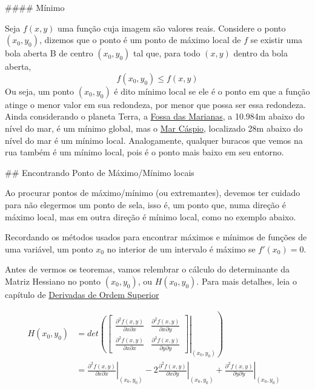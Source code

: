 \documentclass[
  letterpaper,
  DIV=11,
  numbers=noendperiod]{scrreprt}
\begin{document}
\#\#\#\# Mínimo

Seja \(f(x,y)\) uma função cuja imagem são valores reais. Considere o
ponto \((x_0, y_0)\), dizemos que o ponto é um ponto de máximo local de
\(f\) se existir uma bola aberta B de centro \((x_0, y_0)\) tal que,
para todo \((x,y)\) dentro da bola aberta, \[
  f(x_0,y_0) \leq f(x,y)
  \] Ou seja, um ponto \((x_0, y_0)\) é dito mínimo local se ele é o
ponto em que a função atinge o menor valor em sua redondeza, por menor
que possa ser essa redondeza. Ainda considerando o planeta Terra, a
\href{https://pt.wikipedia.org/wiki/Fossa_das_Marianas}{Fossa das
Marianas}, a 10.984m abaixo do nível do mar, é um mínimo global, mas o
\href{https://pt.wikipedia.org/wiki/Mar_Cáspio}{Mar Cáspio}, localizado
28m abaixo do nível do mar é um mínimo local. Analogamente, qualquer
buracos que vemos na rua também é um mínimo local, pois é o ponto mais
baixo em seu entorno.

\#\# Encontrando Ponto de Máximo/Mínimo locais

Ao procurar pontos de máximo/mínimo (ou extremantes), devemos ter
cuidado para não elegermos um ponto de sela, isso é, um ponto que, numa
direção é máximo local, mas em outra direção é mínimo local, como no
exemplo abaixo.

Recordando os métodos usados para encontrar máximos e mínimos de funções
de uma variável, um ponto \(x_0\) no interior de um intervalo é máximo
se \(f'(x_0)=0\).

Antes de vermos os teoremas, vamos relembrar o cálculo do determinante
da Matriz Hessiano no ponto \((x_0, y_0)\), ou \(H(x_0, y_0)\). Para
mais detalhes, leia o capítulo de \href{d-ordem-superior.qmd}{Derivadas
de Ordem Superior}

\[
  \begin{aligned}
  H(x_0, y_0) 
  & = \left. det \left( \begin{bmatrix} \frac{\partial^2{f(x,y)}}{\partial{x}\partial{x}} & \frac{\partial^2{f(x,y)}}{\partial{x}\partial{y}}\\ 
  \frac{\partial^2{f(x,y)}}{\partial{x}\partial{x}} & \frac{\partial^2{f(x,y)}}{\partial{y}\partial{y}} \end{bmatrix} 
  \right |_{(x_0,y_0)} \right )  &\\
  & = \left. \frac{\partial^2{f(x,y)}}{\partial{x}\partial{x}} \right \rvert_{(x_0,y_0)} -2\left. \frac{\partial^2{f(x,y)}}{\partial{x}\partial{y}} \right \rvert_{(x_0,y_0)}+\left. \frac{\partial^2{f(x,y)}}{\partial{y}\partial{y}} \right \rvert_{(x_0,y_0)} &\\
  \end{aligned}
  \]
\end{document}
